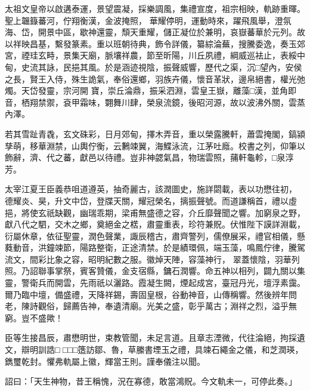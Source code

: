 \begin{pinyinscope}
 太祖文皇帝以啟遘泰運，景望震凝，採樂調風，集禮宣度，祖宗相映，軌跡重暉。聖上韞籙蕃河，佇翔衡漢，金波掩照，
 華耀停明，運動時來，躍飛風舉，澄氛海、岱，開景中區，歇神還靈，頹天重耀，儲正凝位於兼明，哀嶽蕃華於元列。故以祥映昌基，繫發篆素。重以班朝待典，飾令詳儀，纂綜淪蕪，搜騰委逸，奏玉郊宮，禋珪玄畤，景集天廟，脈壤祥農，節至昕陽，川丘夙禮，綱威巡袪止，表綏中甸，史流其詠，民挹其風。於是涵迹視陰，振聲威響，歷代之渠，沉□望內，安侯之長，賢王入侍，殊生詭氣，奉俗還鄉，羽族卉儀，懷音革狀，邊帛絕書，權光弛燭。天岱發靈，宗河開
 寶，崇丘淪鼎，振采泗淵，雲皇王嶽，離藻□漢，並角即音，栖翔禁禦，袞甲霜味，翾舞川肆，榮泉流鏡，後昭河源，故以波沸外關，雲蒸內澤。



 若其雪趾青毳，玄文硃彩，日月郊甸，擇木弄音，重以榮露騰軒，蕭雲掩閣，鎬潁孳萌，移華淵禁，山輿佇衡，云鶼竦翼，海鰈泳流，江茅吐廕。校書之列，仰筆以飾辭，濟、代之蕃，獻邑以待禮。豈非神勰氣昌，物瑞雲照，蒱軒龜軫，□泉淳芳。



 太宰江夏王臣義恭咀道遵英，抽奇麗古，該潤圖史，施詳閟載，表以功懋往初，
 德耀炎、昊，升文中岱，登牒天關，耀冠榮名，摛振聲號。而道謙稱首，禮以虛挹，將使玄祇缺觀，幽瑞乖期，梁甫無盛德之容，介丘靡聲聞之響。加窮泉之野，獻八代之駟，交木之鄉，奠絕金之楛，肅靈重表，珍符兼貺。伏惟陛下謨詳淵載，衍屬休章，依征聖靈，潤色聲業，諏辰稽古，肅齊警列，儒僚展采，禮官相儀，懸蕤動音，洪鐘竦節，陽路整衛，正途清禁。於是績環佩，端玉藻，鳴鳳佇律，騰駕流文，間彩比象之容，昭明紀數之服。徽焯天陣，容藻神行，
 翠蓋懷陰，羽華列照。乃詔聯事掌祭，賓客贊儀，金支宿縣，鏞石潤響。命五神以相列，闢九關以集靈，警衛兵而開雲，先雨祇以灑路。霞凝生闕，煙起成宮，臺冠丹光，壇浮素靄。爾乃臨中壇，備盛禮，天降祥錫，壽固皇根，谷動神音，山傳稱響。然後辨年問老，陳詩觀俗，歸薦告神，奉遺清廟。光美之盛，彰乎萬古；淵祥之烈，溢乎無窮。豈不盛歟！



 臣等生接昌辰，肅懋明世，束教管聞，未足言道。且章志湮微，代往淪絕，拘採遺文，辯明訓誥□
 □□□簉訪鄒、魯，草縢書堙玉之禮，具竦石繩金之儀，和芝潤瑛，鐫璽乾封。懼弗軌屬上徽，輝當王則。謹奉儀注以聞。



 詔曰：「天生神物，昔王稱愧，況在寡德，敢當鴻貺。今文軌未一，可停此奏。」




\end{pinyinscope}
